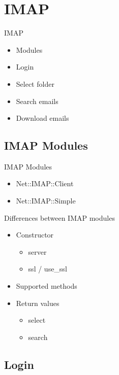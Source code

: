 \section{IMAP}

\begin{frame}{IMAP}
  \begin{itemize}
  \item Modules
  \item Login
  \item Select folder
  \item Search emails
  \item Download emails
  \end{itemize}
\end{frame}

\subsection{IMAP Modules}

\begin{frame}{IMAP Modules}
  \begin{itemize}
  \item Net::IMAP::Client
  \item Net::IMAP::Simple
  \end{itemize}
\end{frame}

\begin{frame}[fragile]{Differences between IMAP modules}
  \begin{itemize}
  \item Constructor
    \begin{itemize}
      \item server
      \item ssl / use\_ssl
    \end{itemize}
  \item Supported methods
  \item Return values
    \begin{itemize}
    \item select
      \item search
    \end{itemize}
  \end{itemize}
\end{frame}

\subsection{Login}

